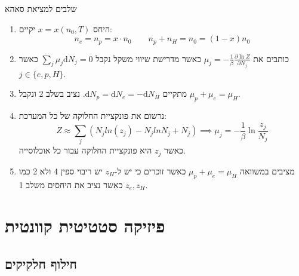 \documentclass{tstextbook}
\begin{document}
\begin{summary}
שלבים למציאת סאהא

  \begin{enumerate}
    \item היחס \(x=x(n_{0},T)\) יקיים: 
$$n_{e}=n_{p}=x\cdot n_{0}\qquad n_{p}+n_{H}=n_{0}=(1-x)n_{0}$$


    \item כותבים את \(\mu_{j}=-\frac{1}{\beta}\frac{\partial \ln Z}{\partial N_{j}}\) כאשר מדרישת שיווי משקל נקבל \(\sum_{j}\mu_{j}\mathrm{d}N_{j}=0\) כאשר \(j \in \{ e,p,H \}\).  


    \item מתקיים \(\mathrm{d}N_{p}=\mathrm{d}N_{e}=-\mathrm{d}N_{H}\). נציב בשלב 2 ונקבל \(\mu_{p}+\mu_{e}=\mu_{H}\). 


    \item נרשום את פונקציית החלוקה של כל המערכת: 
$$Z\approx\sum_{j}\left(N_{j}l n\left(z_{j}\right)-N_{j}l n N_{j}+N_{j}\right)\implies \mu_{j}=-\frac{1}{\beta}\ln \frac{z_{j}}{N_{j}}$$
כאשר \(z_{j}\) היא פונקציית החלוקה עבור כל אוכלוסייה.


    \item מציבים במשוואה \(\mu_{p}+\mu_{e}=\mu_{H}\) כאשר זוכרים כי יש ל-\(z_{H}\) יש ריבוי ספין 4 ולא 2 כמו \(z_{e},z_{H}\) כאשר נציב את היחסים משלב 1. 


  \end{enumerate}
\end{summary}
\section{פיזיקה סטטיטית קוונטית}

\subsection{חילוף חלקיקים}
\end{document}
